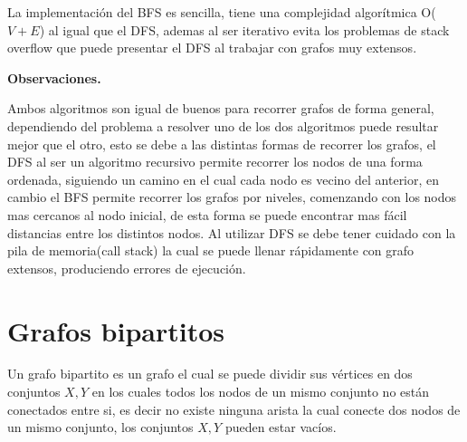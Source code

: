 \documentclass[12pt, a4paper]{article}
\newcommand\cppfile[2][]{

}
\newcommand{\subtitulo}[1]{\begin{center}\textbf{#1}\end{center}}
\begin{document}
	La implementación del BFS es sencilla, tiene una complejidad algorítmica O($V+E$) al igual que el DFS, ademas al 
	ser iterativo evita los problemas de stack overflow que puede presentar el DFS al trabajar con grafos muy extensos.	
	\cppfile[8-25]{Grafos/codigos/BFS.cpp}
	
	\subtitulo{Observaciones.}
	
	Ambos algoritmos son igual de buenos para recorrer grafos de forma general, dependiendo del problema a resolver
	uno de los dos algoritmos puede resultar mejor que el otro, esto se debe a las distintas formas de recorrer
	los grafos, el DFS al ser un algoritmo recursivo permite recorrer los nodos de una forma ordenada, siguiendo un
	camino en el cual cada nodo es vecino del anterior, en cambio el BFS permite recorrer los grafos por niveles, 
	comenzando con los nodos mas cercanos al nodo inicial, de esta forma se puede encontrar mas fácil distancias entre
	los distintos nodos. Al utilizar DFS se debe tener cuidado con la pila de memoria(call stack) la cual se puede
	llenar rápidamente con grafo extensos, produciendo errores de ejecución.
	
	\section{Grafos bipartitos}
	\label{grafos:grafos_bipartitos}
	
	Un grafo bipartito es un grafo el cual se puede dividir sus vértices en dos conjuntos ${X, Y}$ en los cuales
	todos los nodos de un mismo conjunto no están conectados entre si, es decir no existe ninguna arista la cual
	conecte dos nodos de un mismo conjunto, los conjuntos ${X, Y}$ pueden estar vacíos.\\
	
\end{document}
